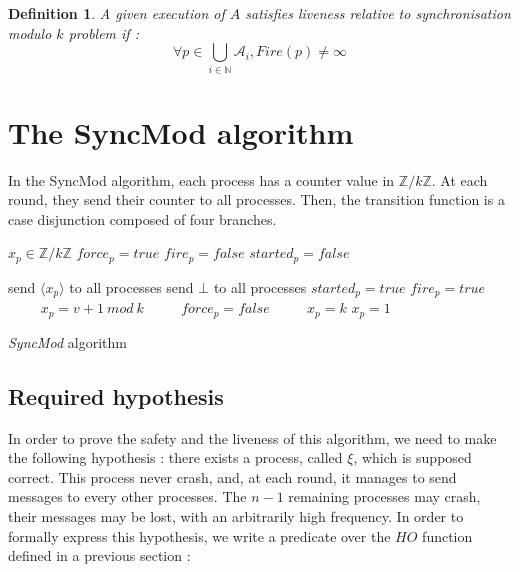\documentclass{article}
\newtheorem{definition}{Definition}
\begin{document}
\begin{definition}
	A given execution of $A$ satisfies liveness relative to synchronisation modulo $k$ problem if :
	$$\forall p \in \bigcup\limits_{i \in \mathds{N}} \mathcal{A}_i, Fire(p) \neq \infty$$
\end{definition}

\section{The SyncMod algorithm}

In the SyncMod algorithm, each process has a counter value in $\mathds{Z}/k\mathds{Z}$. At each round,
they send their counter to all processes.
Then, the transition function is a case disjunction composed of four branches.

\begin{algorithm}[htb]
\begin{distribalgo}[1]
\BLANK {}
	\STATE $x_p \in \mathds{Z}/k\mathds{Z}$
	\STATE $force_p = true$
	\STATE $fire_p = false$
	\STATE $started_p = false$

\ENDINDENT \BLANK

			\STATE send $\langle x_p \rangle$ to all processes
		\ELSE
			\STATE send $\bot$ to all processes
		\ENDIF
	\ENDINDENT
	\BLANK
		\STATE $started_p = true$
			\STATE $fire_p = true$ ~~~~
		\ENDIF
			\STATE $x_p = v+1~mod~k$ ~~~~
			\STATE $force_p = false$ ~~~~
			\STATE $x_p = k$
		\ELSE
			\STATE $x_p = 1$ ~~~~
		\ENDIF
	\ENDINDENT
\ENDINDENT 
\caption{{\em SyncMod} algorithm} \label{algo:R}
\end{distribalgo}

\end{algorithm}

\subsection{Required hypothesis}

In order to prove the safety and the liveness of this algorithm, we need to make the following hypothesis :
there exists a process, called $\xi$, which is supposed correct. This process never crash, and, at each round, it manages to send 
messages to every other processes. The $n-1$ remaining processes may crash, their messages may be lost, with an arbitrarily high frequency.
In order to formally express this hypothesis, we write a predicate over the $HO$ function defined in a previous section :
\end{document}
